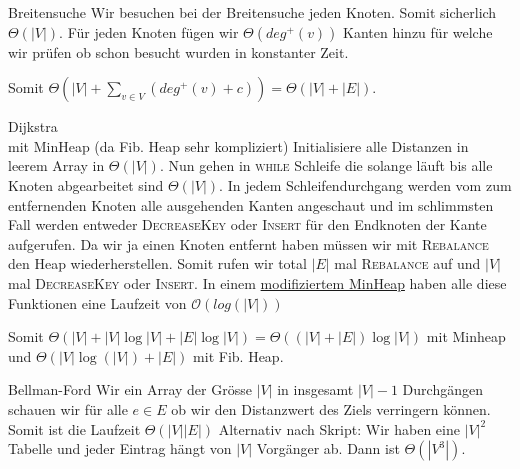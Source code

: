 \documentclass[avery5371,grid]{flashcards}
\begin{document}
\begin{flashcard}[A\&D]{Breitensuche}
        Wir besuchen bei der Breitensuche jeden Knoten. Somit sicherlich ${\Theta}(|V|)$. Für jeden Knoten fügen wir ${\Theta}(deg^{+}(v))$ Kanten hinzu für welche wir prüfen ob schon besucht wurden in konstanter Zeit.
        \par 
        Somit ${\Theta}(|V| + \sum_{v\in V} (deg^{+}(v) + c) ) = {\Theta}(|V| + |E|)$.
\end{flashcard}



\begin{flashcard}[A\&D]{Dijkstra \\  {\small mit MinHeap (da Fib. Heap sehr kompliziert)}}
    Initialisiere alle Distanzen in leerem Array in $\Theta(|V|)$.
    Nun gehen in \textsc{while} Schleife die solange läuft bis alle Knoten abgearbeitet sind $\Theta(|V|)$. In jedem Schleifendurchgang werden vom zum entfernenden Knoten alle ausgehenden Kanten angeschaut und im schlimmsten Fall werden entweder \textsc{DecreaseKey} oder \textsc{Insert} für den Endknoten der Kante aufgerufen.
    Da wir ja einen Knoten entfernt haben müssen wir mit \textsc{Rebalance} den Heap wiederherstellen. Somit rufen wir total $|E|$ mal \textsc{Rebalance} auf und $|V|$ mal \textsc{DecreaseKey} oder \textsc{Insert}. In einem \href{https://github.com/ModumUnlimited/DavesAlgorithmCollection/blob/master/datastructures/DecreaseKeyMinHeap.java}{modifiziertem MinHeap} haben alle diese Funktionen eine Laufzeit von $\mathcal{O}(log(|V|))$


    Somit ${\Theta}(|V| + |V|\log|V| + |E|\log|V|) = {\Theta}((|V|+ |E|)\log |V|)$ mit Minheap und ${\Theta(|V|\log(|V|)+|E|)}$ mit Fib. Heap.
\end{flashcard}






\begin{flashcard}[A\&D]{Bellman-Ford}
    Wir ein Array der Grösse $|V|$ in insgesamt $|V|-1$ Durchgängen schauen wir für alle $e\in E$ ob wir den Distanzwert des Ziels verringern können. Somit ist die Laufzeit $\Theta(|V||E|)$
    \vspace{0.5cm}
    Alternativ nach Skript: Wir haben eine $|V|^2$ Tabelle und jeder Eintrag hängt von $|V|$ Vorgänger ab. Dann ist $\Theta(|V^3|)$.
\end{flashcard}
\end{document}
